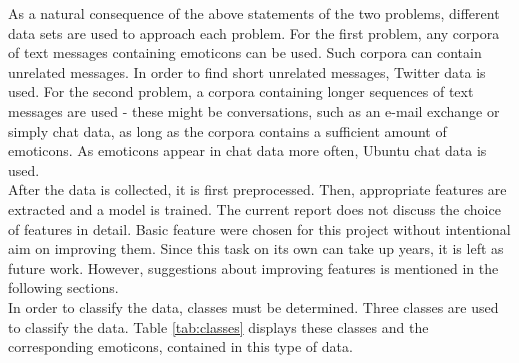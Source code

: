 \documentclass{article} %
\begin{document}
\noindent As a natural consequence of the above statements of the two problems, different data sets are used to approach each problem. For the first problem, any corpora of text messages containing emoticons can be used. Such corpora can contain unrelated messages. In order to find short unrelated messages, Twitter data is used. For the second problem, a corpora containing longer sequences of text messages are used - these might be conversations, such as an e-mail exchange or simply chat data, as long as the corpora contains a sufficient amount of emoticons. As emoticons appear in chat data more often, Ubuntu chat data is used. \\

\noindent After the data is collected, it is first preprocessed. Then, appropriate features are extracted and a model is trained. The current report does not discuss the choice of features in detail. Basic feature were chosen for this project without intentional aim on improving them. Since this task on its own can take up years, it is left as future work. However, suggestions about improving features is mentioned in the following sections. \\

\noindent In order to classify the data, classes must be determined. Three classes are used to classify the data. Table \ref{tab:classes} displays these classes and the corresponding emoticons, contained in this type of data.


\begin{comment}
\begin{itemize}
\item \textbf{positive} - data containing `positive' emoticons (expressing positive emotions) such as `:)', `:]', `=)', or `:D'
\item \textbf{neutral} - data containing no emoticons or neutral emoticons like `:$\vert$' or `o\_o'
\item \textbf{negative} - data containing `negative' emoticons (expressing negative emotions) such as `:(', `:[', `=(` or `;(' 
\end{itemize}
\end{comment}
\end{document}
